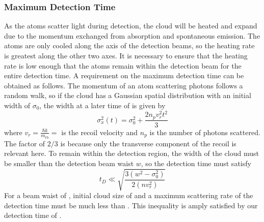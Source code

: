 \subsubsection{Maximum Detection Time}\label{subsubsec:intensity_dependendce}
As the atoms scatter light during detection, the cloud will be heated
and expand due to the momentum exchanged from absorption and
spontaneous emission. The atoms are only cooled along the axis of the
detection beams, so the heating rate is greatest along the other two
axes. It is necessary to ensure that the
heating rate is low enough that the atoms remain within the
detection beam for the entire detection time. A requirement on the
maximum detection time can be obtained as follows. The momentum of
an atom scattering photons follows a random walk, so 
if the cloud has a
Gaussian spatial distribution with an
initial width of \(\sigma_0\), the width at a later time of
is given by
\begin{equation}
\sigma_x^2(t) = \sigma_0^2 + \frac{2 n_p v_r^2 t^2}{3} 
  \label{eq:width_scattering}
\end{equation}
where \(v_r = \frac{\hbar k}{m_\text{rb}} =
\)  is the recoil velocity and \(n_p\) is the
number of photons scattered. The factor of $2/3$ is because only the
transverse component of the recoil is relevant here. To remain within the detection region,
the width of the cloud must be smaller than the detection beam waist
\(w\), so the detection time must satisfy
\begin{equation}
  t_D \ll \sqrt{\frac{3 \left(w^2-\sigma_0^2\right)}{2 \left(n
  v_r^2\right)}}
  \label{eq:detection_time}
\end{equation}
For a beam waist of , initial cloud size of
 and a maximum scattering rate of
 the detection time must be much less than
. This inequality is amply satisfied by
our detection time of .
